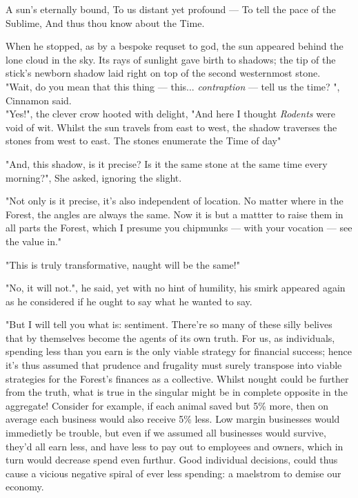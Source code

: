 	A sun's eternally bound,
	To us distant yet profound —
	To tell the pace of the Sublime,
	And thus thou know about the Time.

When he stopped, as by a bespoke requset to god, the sun appeared behind the lone cloud in the sky. Its rays of sunlight gave birth to shadows; the tip of the stick's newborn shadow laid right on top of the second westernmost stone.\\

"Wait, do you mean that this thing — this... \textit{contraption} — tell us the time? ", Cinnamon said.\\

"Yes!", the clever crow hooted with delight, "And here I thought \textit{Rodents} were void of wit. Whilst the sun travels from east to west, the shadow traverses the stones from west to east. The stones enumerate the Time of day"

"And, this shadow, is it precise? Is it the same stone at the same time every morning?", She asked, ignoring the slight.

"Not only is it precise, it's also independent of location. No matter where in the Forest, the angles are always the same. Now it is but a mattter to raise them in all parts the Forest, which I presume you chipmunks — with your vocation — see the value in."

"This is truly transformative, naught will be the same!" 

"No, it will not.", he said, yet with no hint of humility, his smirk appeared again as he considered if he ought to say what he wanted to say.

"But I will tell you what is: sentiment. There're so many of these silly belives that by themselves become the agents of its own truth. For us, as individuals, spending less than you earn is the only viable strategy for financial success; hence it's thus assumed that prudence and frugality must surely transpose into viable strategies for the Forest's finances as a collective. Whilst nought could be further from the truth, what is true in the singular might be in complete opposite in the aggregate! Consider for example, if each animal saved but 5\% more, then on average each business would also receive 5\% less. Low margin businesses would immedietly be trouble, but even if we assumed all businesses would survive, they'd all earn less, and have less to pay out to employees and owners, which in turn would decrease spend even furthur. Good individual decisions, could thus cause a vicious negative spiral of ever less spending: a maelstrom to demise our economy. 
  
